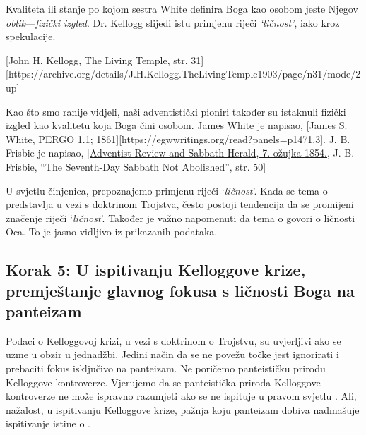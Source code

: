 Kvaliteta ili stanje po kojom sestra White definira Boga kao osobom jeste Njegov \textit{oblik}—\textit{fizički izgled}. Dr. Kellogg slijedi istu primjenu riječi \textit{‘ličnost’}, iako kroz spekulacije.

[John H. Kellogg, The Living Temple, str. 31][https://archive.org/details/J.H.Kellogg.TheLivingTemple1903/page/n31/mode/2up]

Kao što smo ranije vidjeli, naši adventistički pioniri također su istaknuli fizički izgled kao kvalitetu koja Boga čini osobom. James White je napisao, [James S. White, PERGO 1.1; 1861][https://egwwritings.org/read?panels=p1471.3]. J. B. Frisbie je napisao, [\href{https://documents.adventistarchives.org/Periodicals/RH/RH18540307-V05-07.pdf}{Adventist Review and Sabbath Herald, 7. ožujka 1854.}, J. B. Frisbie, “The Seventh-Day Sabbath Not Abolished”, str. 50]

U svjetlu činjenica, prepoznajemo primjenu riječi ‘\textit{ličnost}’. Kada se tema o  predstavlja u vezi s doktrinom Trojstva, često postoji tendencija da se promijeni značenje riječi ‘\textit{ličnost}’. Također je važno napomenuti da tema o  govori o ličnosti Oca. To je jasno vidljivo iz prikazanih podataka.

\subsection*{Korak 5: U ispitivanju Kelloggove krize, premještanje glavnog fokusa s ličnosti Boga na panteizam}

Podaci o Kelloggovoj krizi, u vezi s doktrinom o Trojstvu, su uvjerljivi ako se  uzme u obzir u jednadžbi. Jedini način da se ne povežu točke jest ignorirati  i prebaciti fokus isključivo na panteizam. Ne poričemo panteističku prirodu Kelloggove kontroverze. Vjerujemo da se panteistička priroda Kelloggove kontroverze ne može ispravno razumjeti ako se ne ispituje u pravom svjetlu . Ali, nažalost, u ispitivanju Kelloggove krize, pažnja koju panteizam dobiva nadmašuje ispitivanje istine o .

